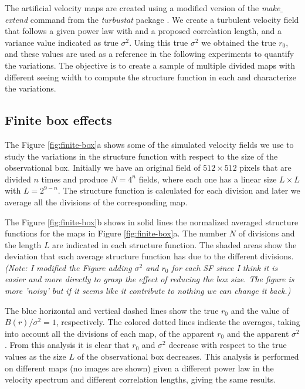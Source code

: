\documentclass[fleqn,usenatbib, useAMS, a4paper]{mnras}
\begin{document}
The artificial velocity maps are created using a modified version of the \textit{make$\_$extend} command from the \textit{turbustat} package \citep{Koch2019AJ....158....1K}.
We create a turbulent velocity field that follows a given power law with and a proposed correlation length, and a variance value indicated as true \(\sigma^2\).
Using this true \(\sigma^2\) we obtained the true \(r_0\), and these values are used as a reference in the following experiments to quantify the variations.
The objective is to create a sample of multiple divided maps with different seeing width to compute the structure function in each and characterize the variations. 

\subsection{Finite box effects}
\label{sec:finite-box-effects}

The Figure \ref{fig:finite-box}a shows some of the simulated velocity fields we use to study the variations in the structure function with respect to the size of the observational box.
Initially we have an original field of \(512 \times 512 \) pixels that are divided \(n\) times and produce \(N = 4^n\) fields, where each one has a linear size \(L \times L \) with \(L = 2^{9 -n}\).
The structure function is calculated for each division and later we average all the divisions of the corresponding map. 

The Figure \ref{fig:finite-box}b shows in solid lines the normalized averaged structure functions for the maps in Figure \ref{fig:finite-box}a.
The number \(N\) of divisions and the length \(L\) are indicated in each structure function.
The shaded areas show the deviation that each average structure function has due to the different divisions. 
\textit{(Note: I modified the Figure adding \(\sigma^2\) and \(r_0\) for each SF since I think it is easier and more directly to grasp the effect of reducing the box size. The figure is more 'noisy' but if it seems like it contribute to nothing we can change it back.)}

The blue horizontal and vertical dashed lines show the true \(r_{0}\) and the value of \(B(r) / \sigma^2 = 1 \), respectively.
The colored dotted lines indicate the averages, taking into account all the divisions of each map, of the apparent \(r_ {0}\) and the apparent \(\sigma^2 \).
From this analysis it is clear that \(r_0\) and \(\sigma^ 2 \) decrease with respect to the true values as the size \(L\) of the observational box decreases. 
This analysis is performed on different maps (no images are shown) given a different power law in the velocity spectrum and different correlation lengths, giving the same results. 
\end{document}

